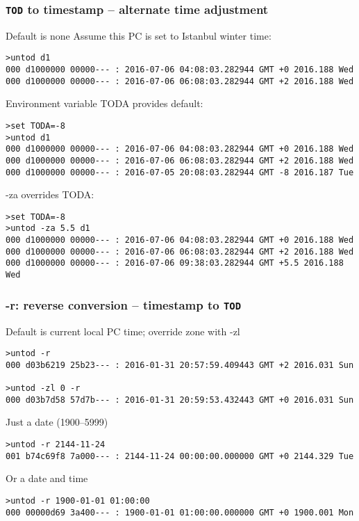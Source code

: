 \documentclass[10pt,xcolor=x11names]{beamer}
\newcommand{\tod}{\texttt{TOD}}
\begin{document}
\begin{frame}[fragile]
  \frametitle{\tod{} to timestamp -- alternate time adjustment}
  \begin{block}{Default is none}
Assume this PC is set to Istanbul winter time:
  \begin{lstlisting}
>untod d1
000 d1000000 00000--- : 2016-07-06 04:08:03.282944 GMT +0 2016.188 Wed
000 d1000000 00000--- : 2016-07-06 06:08:03.282944 GMT +2 2016.188 Wed
  \end{lstlisting}
  \end{block}
  \begin{block}{Environment variable TODA provides default:}
  \begin{lstlisting}
>set TODA=-8
>untod d1
000 d1000000 00000--- : 2016-07-06 04:08:03.282944 GMT +0 2016.188 Wed
000 d1000000 00000--- : 2016-07-06 06:08:03.282944 GMT +2 2016.188 Wed
000 d1000000 00000--- : 2016-07-05 20:08:03.282944 GMT -8 2016.187 Tue
  \end{lstlisting}
  \end{block}
  \begin{block}{-za overrides TODA:}
  \begin{lstlisting}
>set TODA=-8
>untod -za 5.5 d1
000 d1000000 00000--- : 2016-07-06 04:08:03.282944 GMT +0 2016.188 Wed
000 d1000000 00000--- : 2016-07-06 06:08:03.282944 GMT +2 2016.188 Wed
000 d1000000 00000--- : 2016-07-06 09:38:03.282944 GMT +5.5 2016.188 Wed
  \end{lstlisting}
  \end{block}

\end{frame}

\begin{frame}[fragile]
  \frametitle{-r: reverse conversion -- timestamp to \tod{}}
  \begin{block}{Default is current local PC time; override zone with -zl}
  \begin{lstlisting}
>untod -r 
000 d03b6219 25b23--- : 2016-01-31 20:57:59.409443 GMT +2 2016.031 Sun

>untod -zl 0 -r
000 d03b7d58 57d7b--- : 2016-01-31 20:59:53.432443 GMT +0 2016.031 Sun
  \end{lstlisting}
  \end{block}
  \begin{block}{Just a date (1900--5999)}
  \begin{lstlisting}
>untod -r 2144-11-24
001 b74c69f8 7a000--- : 2144-11-24 00:00:00.000000 GMT +0 2144.329 Tue
  \end{lstlisting}
  \end{block}
  \begin{block}{Or a date and time}
  \begin{lstlisting}
>untod -r 1900-01-01 01:00:00
000 00000d69 3a400--- : 1900-01-01 01:00:00.000000 GMT +0 1900.001 Mon
  \end{lstlisting}
  \end{block}

\end{frame}
\end{document}
